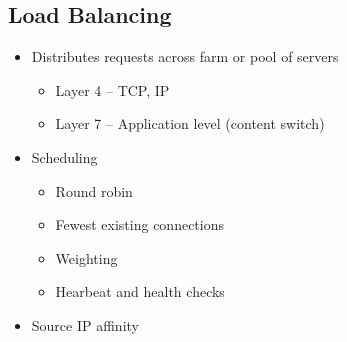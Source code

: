 	\subsection {Load Balancing}
		\begin{itemize}
			\item Distributes requests across farm or pool of servers
				\begin{itemize}
					\item Layer 4 -- TCP, IP
					\item Layer 7 -- Application level (content switch)
				\end{itemize}
			\item Scheduling
				\begin{itemize}
					\item Round robin
					\item Fewest existing connections
					\item Weighting
					\item Hearbeat and health checks
				\end{itemize}
			\item Source IP affinity
		\end{itemize}
